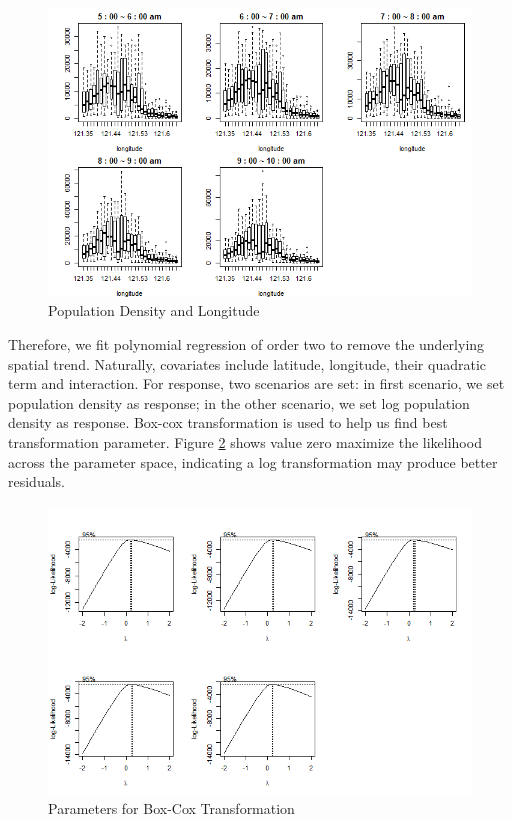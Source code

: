 \documentclass[hidelinks,12pt]{article}
\begin{document}
	\begin{figure}[!ht]
		\includegraphics[width=\textwidth]{long.png}
		\caption{Population Density and Longitude\label{fig:long}}
	\end{figure}
	\FloatBarrier
	Therefore, we fit polynomial regression of order two to remove the underlying spatial trend. Naturally, covariates include latitude, longitude, their quadratic term and interaction. For response, two scenarios are set: in first scenario, we set population density as response; in the other scenario, we set log population density as response. Box-cox transformation is used to help us find best transformation parameter. Figure \ref{fig:boxcox} shows value zero maximize the likelihood across the parameter space, indicating a log transformation may produce better residuals. 
	\begin{figure}[!ht]
		\includegraphics[width=\textwidth]{boxcox.png}
		\caption{Parameters for Box-Cox Transformation\label{fig:boxcox}}
	\end{figure}
	\FloatBarrier	
	
\end{document}
